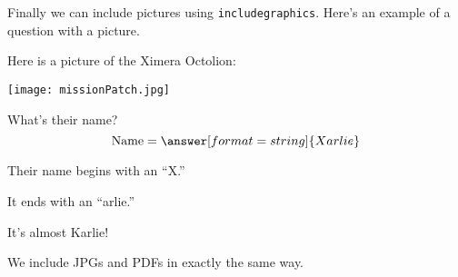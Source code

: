 \documentclass{ximera}
\begin{document}
Finally we can include pictures using \verb|includegraphics|. Here's an example of a question with a picture.
\begin{question}
    Here is a picture of the Ximera Octolion:
    \begin{center}
        \texttt{[image: missionPatch.jpg]}
    \end{center}
    What's their name?
    \[
    \text{Name} = \answer[format=string]{Xarlie}
    \]
    \begin{hint}
        Their name begins with an ``X.''
    \end{hint}
    \begin{hint}
        It ends with an ``arlie.''
    \end{hint}
    \begin{hint}
        It's almost Karlie!
    \end{hint}
\end{question}

We include JPGs and PDFs in exactly the same way.
\end{document}
